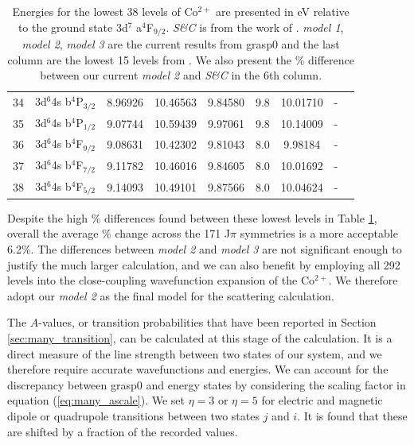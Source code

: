 \begin{table}[h]
\begin{center}
\begin{tabular}{@{} l *8c @{}}
\multicolumn{1}{c}{ 34} & 3d$^6$4s b$^4$P$_{ 3/2}$ &  8.96926  &  10.46563 &   9.84580 &  9.8 & 10.01710   & - \\
\multicolumn{1}{c}{ 35} & 3d$^6$4s b$^4$P$_{ 1/2}$ &  9.07744  &  10.59439 &    9.97061 &  9.8 & 10.14009  & - \\
\multicolumn{1}{c}{ 36} & 3d$^6$4s b$^4$F$_{ 9/2}$ &  9.08631  &  10.42302 &    9.81043 &  8.0 & 9.98184  & - \\
\multicolumn{1}{c}{ 37} & 3d$^6$4s b$^4$F$_{ 7/2}$ &  9.11782  &  10.46016 &    9.84605 &  8.0 & 10.01692  & - \\
\multicolumn{1}{c}{ 38} & 3d$^6$4s b$^4$F$_{ 5/2}$ &  9.14093  &  10.49101 &    9.87566 &  8.0 & 10.04624  & - \\
            \bottomrule
 \end{tabular}
 \caption{Energies for the lowest 38 levels of Co$^{2+}$ are presented in eV relative to the ground state 3d$^7$ a$^4$F$_{9/2}$. \textit{S\&C} is from the work of \citet{1985aeli.book.....S}. \textit{model 1}, \textit{model 2}, \textit{model 3} are the current results from {\sc grasp}0 and the last column are the lowest 15 levels from \citet{2016MNRAS.tmp..556S}. We also present the $\%$ difference between our current \textit{model 2} and \textit{S\&C} in the 6th column. \label{tab:co_energy}}
 \end{center}
\end{table}
%

Despite the high $\%$ differences found between these lowest levels in Table \ref{tab:co_energy}, overall the average $\%$ change across the 171 \citet{1985aeli.book.....S} J$\pi$ symmetries is a more acceptable 6.2$\%$. The differences between \textit{model 2} and \textit{model 3} are not significant enough to justify the much larger calculation, and we can also benefit by employing all 292 levels into the close-coupling wavefunction expansion of the Co$^{2+}$. We therefore adopt our \textit{model 2} as the final model for the scattering calculation. 

The $A$-values, or transition probabilities that have been reported in Section \ref{sec:many_transition}, can be calculated at this stage of the calculation. It is a direct measure of the line strength between two states of our system, and we therefore require accurate wavefunctions and energies. We can account for the discrepancy between {\sc grasp0} and \citet{1985aeli.book.....S} energy states by considering the scaling factor in equation (\ref{eq:many_ascale}). We set $\eta=3$ or $\eta=5$ for electric and magnetic dipole or quadrupole transitions between two states $j$ and $i$. It is found that these are shifted by a fraction of the recorded values.

